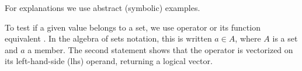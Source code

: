 \documentclass[krantz2]{krantz}\usepackage{knitr}
\begin{document}
For explanations we use abstract (symbolic) examples.

\begin{knitrout}\footnotesize
{}\color{fgcolor}\begin{kframe}
\begin{alltt}
 \hlkwb{<-} \hlstd{(}\hlstd{,} \hlstd{,} \hlstd{,} \hlstd{)}
\end{alltt}
\end{kframe}
\end{knitrout}

To test if a given value belongs to a set, we use operator  or its function equivalent . In the algebra of sets notation, this is written $a \in A$, where $A$ is a set and $a$ a member. The second statement shows that the  operator is vectorized on its left-hand-side (lhs) operand, returning a logical vector.

\begin{knitrout}\footnotesize
{}\color{fgcolor}
\end{knitrout}
\end{document}
